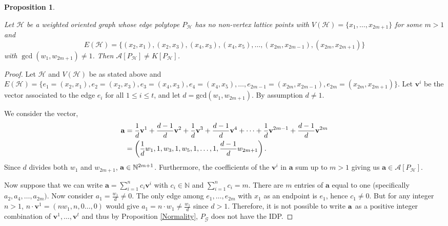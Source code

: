 \documentclass [12pt,a4paper,reqno]{amsart}
\theoremstyle{plain}
\newtheorem{Proposition}[Theorem]{Proposition}
\theoremstyle{definition}
\newtheorem{Assumptions and Discussion}[Theorem]{Assumptions and Discussion}
\theoremstyle{remark}
\newcommand\bfa{\mathbf{a}}
\newcommand\bfv{\mathbf{v}}
\newcommand\calA{\mathcal{A}}
\newcommand\calG{\mathcal{G}}
\newcommand\calH{\mathcal{H}}
\begin{document}
\begin{Proposition}\label{LonggcdNot1}

Let $\calH$ be a weighted oriented graph whose edge polytope $P_\calH$ has no non-vertex lattice points with $V(\calH) = \{x_1, \dots, x_{2m+1}\}$ for some $m>1$ and 
\[E(\calH) = \{(x_2, x_1), (x_2, x_3), (x_4, x_3), (x_4, x_5), \dots, (x_{2m}, x_{2m-1}), (x_{2m}, x_{2m+1})\}\] with $\gcd(w_1, w_{2m+1}) \neq 1$.  Then  $\calA[P_\calH]\neq K[P_\calH]$.
\end{Proposition}

\begin{proof}
Let $\calH$ and $V(\calH)$ be as stated above and $E(\calH) = \{e_1= (x_2, x_1), e_2 = (x_2, x_3), e_3 = (x_4, x_3), e_4=(x_4, x_5), \dots, e_{2m-1}=(x_{2m}, x_{2m-1}), e_{2m}=(x_{2m}, x_{2m+1})\}$.  Let ${\bfv^i}$ be the vector associated to the edge $e_i$ for all $1 \leq i \leq t$, and let $d = \mathrm{gcd}(w_1, w_{2m+1})$.  By assumption $d \neq 1$.

We consider the vector,
\begin{align*}
{\bf a} 
    &= \frac{1}{d}{\bfv^1}+ \frac{d-1}{d}{\bfv^2} + \frac{1}{d}{\bfv^3} + \frac{d-1}{d}{\bfv^4} + \dots + \frac{1}{d} {\bfv^{2m-1}}+ \frac{d-1}{d}{\bfv^{2m}}\\ 
    &= \left(\frac{1}{d}w_1, 1, w_3, 1, w_5, 1, \dots, 1, \frac{d-1}{d}w_{2m+1}\right).
\end{align*}
Since $d$ divides both $w_1$ and $w_{2m+1}$, ${\bf a} \in \mathbb{N}^{2m+1}$.  Furthermore, the coefficients of the ${\bfv^i}$ in ${\bfa}$ sum up to $m>1$ giving us $\bfa\in\calA[P_\calH]$.

Now suppose that we can write ${\bfa} = \sum_{i=1}^n c_i{\bfv^i}$ with $c_i \in \mathbb{N}$ and $\sum_{i=1}^n c_i = m$.  There are $m$ entries of ${\bfa}$ equal to one (specifically $a_2, a_4, \dots, a_{2m})$.  Now consider $a_1 = \frac{w_1}{d} \neq 0$. The only edge among $e_1, \dots, e_{2m}$ with $x_1$ as an endpoint is $e_1$, hence $c_1 \neq 0$. But for any integer $n>1$, $n\cdot {\bfv^1}=(nw_1,n,0\ldots,0)$ would give $a_1 = n \cdot w_1 \neq \frac{w_1}{d}$ since $d>1$.   Therefore, it is not possible to write ${\bf a}$ as a positive integer combination of ${\bfv^1}, \dots, {\bfv^t}$ and thus by Proposition \ref{Normality}, $P_\calG$ does not have the IDP.
\end{proof}
\end{document}
